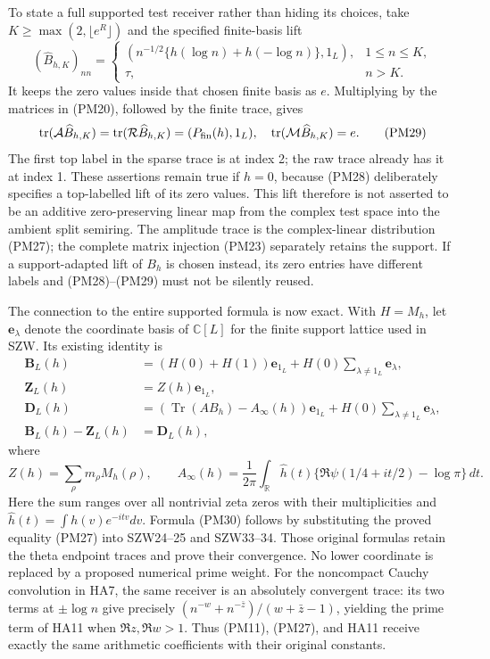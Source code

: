 \documentclass[
  10pt,
  a4paper,
]{article}
\begin{document}
To state a full supported test receiver rather than hiding its choices,
take \(K\ge\max(2,\lfloor e^R\rfloor)\) and the specified finite-basis
lift \[
(\widehat B_{h,K})_{nn}=
\begin{cases}(n^{-1/2}\{h(\log n)+h(-\log n)\},1_L),&1\le n\le K,\\
\tau,&n>K.
\end{cases}
\tag{PM28}
\] It keeps the zero values inside that chosen finite basis as \(e\).
Multiplying by the matrices in (PM20), followed by the finite trace,
gives \[
\operatorname{tr}(\mathcal A\widehat B_{h,K})
=\operatorname{tr}(\mathcal R\widehat B_{h,K})
=(P_{\rm fin}(h),1_L),
\quad
\operatorname{tr}(\mathcal M\widehat B_{h,K})=e.
\tag{PM29}
\] The first top label in the sparse trace is at index 2; the raw trace
already has it at index 1. These assertions remain true if \(h=0\),
because (PM28) deliberately specifies a top-labelled lift of its zero
values. This lift therefore is not asserted to be an additive
zero-preserving linear map from the complex test space into the ambient
split semiring. The amplitude trace is the complex-linear distribution
(PM27); the complete matrix injection (PM23) separately retains the
support. If a support-adapted lift of \(B_h\) is chosen instead, its
zero entries have different labels and (PM28)--(PM29) must not be
silently reused.

The connection to the entire supported formula is now exact. With
\(H=M_h\), let \(\mathbf e_\lambda\) denote the coordinate basis of
\(\mathbb C[L]\) for the finite support lattice used in SZW. Its
existing identity is \[
\begin{aligned}
\boldsymbol B_L(h)&=(H(0)+H(1))\mathbf e_{1_L}
 +H(0)\sum_{\lambda\ne1_L}\mathbf e_\lambda,\\
\boldsymbol Z_L(h)&=Z(h)\mathbf e_{1_L},\\
\boldsymbol D_L(h)&=(\operatorname{Tr}(AB_h)-A_\infty(h))\mathbf e_{1_L}
 +H(0)\sum_{\lambda\ne1_L}\mathbf e_\lambda,\\
\boldsymbol B_L(h)-\boldsymbol Z_L(h)&=\boldsymbol D_L(h),
\end{aligned}
\tag{PM30}
\] where \[
Z(h)=\sum_\rho m_\rho M_h(\rho),\qquad
A_\infty(h)=\frac1{2\pi}\int_{\mathbb R}\widehat h(t)
\{\Re\psi(1/4+it/2)-\log\pi\}\,dt.
\tag{PM31}
\] Here the sum ranges over all nontrivial zeta zeros with their
multiplicities and \(\widehat h(t)=\int h(v)e^{-itv}dv\). Formula (PM30)
follows by substituting the proved equality (PM27) into SZW24--25 and
SZW33--34. Those original formulas retain the theta endpoint traces and
prove their convergence. No lower coordinate is replaced by a proposed
numerical prime weight. For the noncompact Cauchy convolution in HA7,
the same receiver is an absolutely convergent trace: its two terms at
\(\pm\log n\) give precisely \((n^{-w}+n^{-\bar z})/(w+\bar z-1)\),
yielding the prime term of HA11 when \(\Re z,\Re w>1\). Thus (PM11),
(PM27), and HA11 receive exactly the same arithmetic coefficients with
their original constants.
\end{document}
